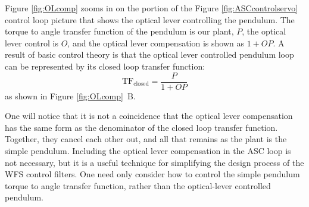 Figure \ref{fig:OLcomp} zooms in on the portion of the Figure \ref{fig:ASCcontrolservo} control loop picture that shows the optical lever controlling the pendulum. The torque to angle transfer function of the pendulum is our plant, $P$, the optical lever control is $O$, and the optical lever compensation is shown as $1+OP$. A result of basic control theory is that the optical lever controlled pendulum loop can be represented by its closed loop transfer function:
\begin{equation}
\mathrm{TF_{closed}} = \frac{P}{1+OP}
\end{equation}
as shown in Figure \ref{fig:OLcomp}~B. 

One will notice that it is not a coincidence that the optical lever compensation has the same form as the denominator of the closed loop transfer function. Together, they cancel each other out, and all that remains as the plant is the simple pendulum. Including the optical lever compensation in the ASC loop is not necessary, but it is a useful technique for simplifying the design process of the WFS control filters. One need only consider how to control the simple pendulum torque to angle transfer function, rather than the optical-lever controlled pendulum.

